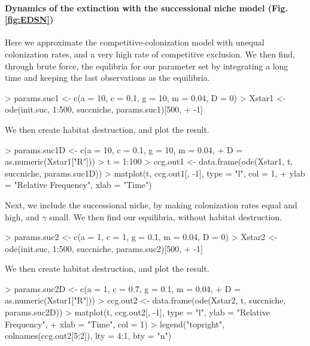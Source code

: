 \begin{boxedminipage}{\linewidth}
{\paragraph{Dynamics of the extinction with the successional niche model (Fig. \ref{fig:EDSN})}
Here we approximate the competitive-colonization model with unequal colonization rates, and a very high rate of competitive exclusion. We then find, through brute force, the equlibria for our parameter set by integrating a long time and keeping the last observations as the equilibria.
\begin{Schunk}
\begin{Sinput}
> params.suc1 <- c(a = 10, c = 0.1, g = 10, m = 0.04, D = 0)
> Xstar1 <- ode(init.suc, 1:500, succniche, params.suc1)[500, 
+     -1]
\end{Sinput}
\end{Schunk}
We then create habitat destruction, and plot the result.
\begin{Schunk}
\begin{Sinput}
> params.suc1D <- c(a = 10, c = 0.1, g = 10, m = 0.04, 
+                   D = as.numeric(Xstar1["R"]))
> t = 1:100
> ccg.out1 <- data.frame(ode(Xstar1, t, succniche, params.suc1D))
> matplot(t, ccg.out1[, -1], type = "l", col = 1, 
+         ylab = "Relative Frequency", xlab = "Time")
\end{Sinput}
\end{Schunk}
Next, we include the successional niche, by making colonization rates equal and high, and $\gamma$ small. We then find our equilibria, without habitat destruction.
\begin{Schunk}
\begin{Sinput}
> params.suc2 <- c(a = 1, c = 1, g = 0.1, m = 0.04, D = 0)
> Xstar2 <- ode(init.suc, 1:500, succniche, params.suc2)[500, 
+     -1]
\end{Sinput}
\end{Schunk}
We then create habitat destruction, and plot the result.
\begin{Schunk}
\begin{Sinput}
> params.suc2D <- c(a = 1, c = 0.7, g = 0.1, m = 0.04, 
+                   D = as.numeric(Xstar1["R"]))
> ccg.out2 <- data.frame(ode(Xstar2, t, succniche, params.suc2D))
> matplot(t, ccg.out2[, -1], type = "l", ylab = "Relative Frequency", 
+     xlab = "Time", col = 1)
> legend("topright", colnames(ccg.out2[5:2]), lty = 4:1, bty = "n")
\end{Sinput}
\end{Schunk}
}
\end{boxedminipage} \medskip

